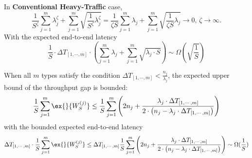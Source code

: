 In \textbf{Conventional Heavy-Traffic} case,
$$\frac{1}{S^{\zeta }}\sum_{j=1}^m \lambda_j^{\zeta } +\sum_{j=1}^m \sqrt{\frac{1}{S^{\zeta }}\lambda_j^{\zeta }}  =\frac{1}{\zeta S}\sum_{j=1}^m \lambda_j +\sum_{j=1}^m \sqrt{\frac{1}{\zeta S}\lambda_j} \to 0, \,\zeta \to \infty.$$
With the expected end-to-end latency
$$\frac{1}{S}\cdot\Delta T_{[1,\cdots,m]} \cdot \left(\sum_{j=1}^m \lambda_j +\sum_{j=1}^m \sqrt{\lambda_j\cdot S} \right) \sim \Omega(\sqrt{\frac{1}{S}})$$

When all $m$ types satisfy the condition $\Delta T_{[1,\cdots,m]} < \frac{n_j}{\lambda_j}$, the expected upper bound of the throughput gap is bounded:
$$\frac{1}{S}\sum_{j=1}^m \ex{}{W_S^{(j)}}\leq \frac{1}{S}  \sum_{j=1}^m \left(2n_j+ \frac{\lambda_j \cdot \Delta T_{[1,\cdots,m]}}{2\cdot\left(n_j - \lambda_j\cdot \Delta T_{[1,\cdots,m]}\right)}\right) $$
with the bounded expected end-to-end latency
$$ \Delta T_{[1,\cdots,m]} \cdot\frac{1}{S}\sum_{j=1}^m \ex{}{W_S^{(j)}}\leq \Delta T_{[1,\cdots,m]}\frac{1}{S}  \sum_{j=1}^m \left(2n_j+ \frac{\lambda_j \cdot \Delta T_{[1,\cdots,m]}}{2\cdot\left(n_j - \lambda_j\cdot \Delta T_{[1,\cdots,m]}\right)}\right) \sim \Omega(\frac{1}{S})$$

